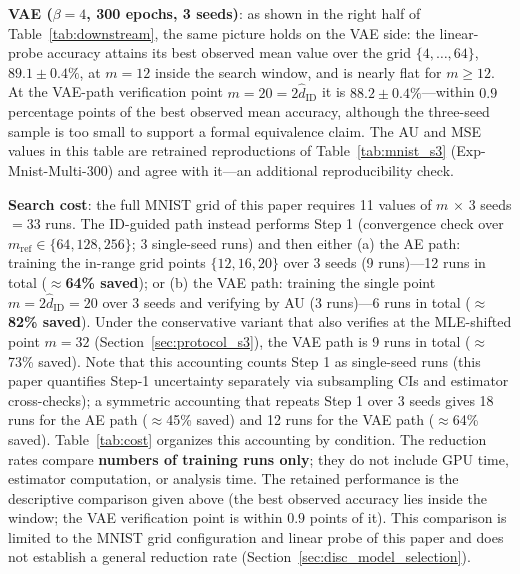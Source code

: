 \documentclass[make,article,submit,pdftex,moreauthors]{Definitions/mdpi}
\newcommand{\hatdID}{\hat{d}_{\mathrm{ID}}}
\begin{document}
\textbf{VAE ($\beta = 4$, 300 epochs, 3 seeds)}:
as shown in the right half of Table~\ref{tab:downstream}, the same picture
holds on the VAE side: the linear-probe accuracy attains its best observed
mean value over the grid $\{4, \ldots, 64\}$, $89.1 \pm 0.4\%$, at $m = 12$
inside the search window, and is nearly flat for $m \geq 12$.
At the VAE-path verification point $m = 20 = 2\hatdID$ it is
$88.2 \pm 0.4\%$---within $0.9$ percentage points of the best observed mean
accuracy, although the three-seed sample is too small to support a formal
equivalence claim.
The AU and MSE values in this table are retrained reproductions of
Table~\ref{tab:mnist_s3} (Exp-Mnist-Multi-300) and agree with it---an
additional reproducibility check.

\textbf{Search cost}: the full MNIST grid of this paper requires 11 values
of $m$ $\times$ 3 seeds $= 33$ runs.
The ID-guided path instead performs Step 1 (convergence check over
$m_{\mathrm{ref}} \in \{64, 128, 256\}$; 3 single-seed runs) and then either
(a) the AE path: training the in-range grid points $\{12, 16, 20\}$ over 3
seeds (9 runs)---12 runs in total (\textbf{$\approx$64\% saved}); or
(b) the VAE path: training the single point $m = 2\hatdID = 20$ over 3 seeds
and verifying by AU (3 runs)---6 runs in total
(\textbf{$\approx$82\% saved}).
Under the conservative variant that also verifies at the MLE-shifted point
$m = 32$ (Section~\ref{sec:protocol_s3}), the VAE path is 9 runs in total
($\approx$73\% saved).
Note that this accounting counts Step 1 as single-seed runs (this paper
quantifies Step-1 uncertainty separately via subsampling CIs and estimator
cross-checks); a symmetric accounting that repeats Step 1 over 3 seeds
gives 18 runs for the AE path ($\approx$45\% saved) and 12 runs for the VAE
path ($\approx$64\% saved).
Table~\ref{tab:cost} organizes this accounting by condition.
The reduction rates compare \textbf{numbers of training runs only}; they do
not include GPU time, estimator computation, or analysis time.
The retained performance is the descriptive comparison given above (the
best observed accuracy lies inside the window; the VAE verification point
is within $0.9$ points of it).
This comparison is limited to the MNIST grid configuration and linear probe
of this paper and does not establish a general reduction rate
(Section~\ref{sec:disc_model_selection}).
\end{document}
